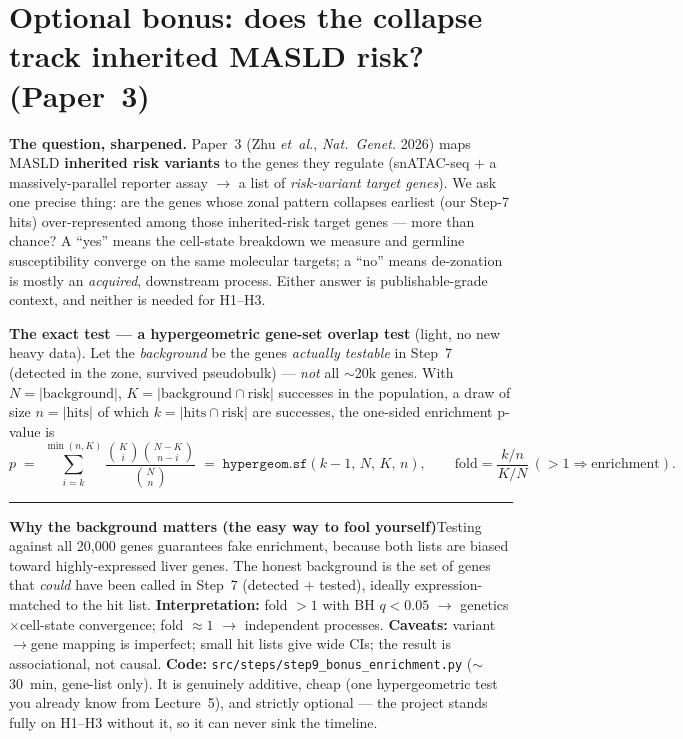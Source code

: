\documentclass[11pt]{article}
\newcommand{\aside}[2]{\par\medskip\noindent\textcolor{teal0}{\rule{2pt}{\baselineskip}}\quad\textbf{\textcolor{teal0}{#1}}\quad #2\par\medskip}
\newcommand{\code}[1]{\texttt{#1}}
\begin{document}
\section{Optional bonus: does the collapse track inherited MASLD risk? (Paper~3)}

\textbf{The question, sharpened.} Paper~3 (Zhu \emph{et~al.}, \emph{Nat.\ Genet.} 2026) maps MASLD
\textbf{inherited risk variants} to the genes they regulate (snATAC-seq $+$ a massively-parallel
reporter assay $\to$ a list of \emph{risk-variant target genes}). We ask one precise thing: are the
genes whose zonal pattern collapses earliest (our Step-7 hits) over-represented among those
inherited-risk target genes --- more than chance? A ``yes'' means the cell-state breakdown we measure
and germline susceptibility converge on the same molecular targets; a ``no'' means de-zonation is mostly
an \emph{acquired}, downstream process. Either answer is publishable-grade context, and neither is needed
for H1--H3.

\textbf{The exact test --- a hypergeometric gene-set overlap test} (light, no new heavy data). Let the
\emph{background} be the genes \emph{actually testable} in Step~7 (detected in the zone, survived
pseudobulk) --- \emph{not} all $\sim$20k genes. With $N=|\text{background}|$, $K=|\text{background}\cap
\text{risk}|$ successes in the population, a draw of size $n=|\text{hits}|$ of which $k=|\text{hits}\cap
\text{risk}|$ are successes, the one-sided enrichment p-value is
\begin{equation}
p \;=\; \sum_{i=k}^{\min(n,K)} \frac{\binom{K}{i}\binom{N-K}{\,n-i\,}}{\binom{N}{n}}
\;=\; \texttt{hypergeom.sf}(k-1,\,N,\,K,\,n),
\qquad
\text{fold} = \frac{k/n}{K/N}\ (>1 \Rightarrow \text{enrichment}).
\end{equation}

\aside{Why the background matters (the easy way to fool yourself)}{Testing against all 20{,}000 genes
guarantees fake enrichment, because both lists are biased toward highly-expressed liver genes. The
honest background is the set of genes that \emph{could} have been called in Step~7 (detected $+$ tested),
ideally expression-matched to the hit list. \textbf{Interpretation:} fold $>1$ with BH $q<0.05$ $\to$
genetics$\times$cell-state convergence; fold $\approx1$ $\to$ independent processes. \textbf{Caveats:}
variant$\to$gene mapping is imperfect; small hit lists give wide CIs; the result is associational, not
causal. \textbf{Code:} \code{src/steps/step9\_bonus\_enrichment.py} ($\sim$30~min, gene-list only). It is
genuinely additive, cheap (one hypergeometric test you already know from Lecture~5), and strictly
optional --- the project stands fully on H1--H3 without it, so it can never sink the timeline.}
\end{document}

